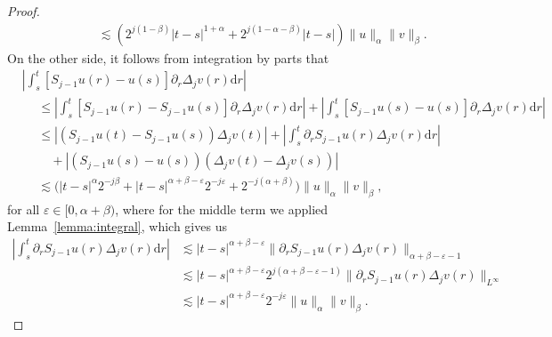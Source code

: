 \documentclass[a4paper,11pt]{article}
\newcommand{\mathd}{\mathrm{d}}
\theoremstyle{remark}
\begin{document}
\begin{proof}
\begin{align}
    &\hspace{50pt} \lesssim ( 2^{j ( 1- \beta)} | t-s |^{1+\alpha} +2^{j ( 1- \alpha - \beta )} | t-s | ) \| u \|_{\alpha} \| v \|_{\beta} .
  \end{align}
  On the other side, it follows from integration by parts that
  \begin{align}\label{eq:controlled old and new pr2} \nonumber
     &\left| \int_{s}^{t} [ S_{j-1} u ( r ) - u ( s ) ] \partial_{r}  \Delta_{j} v ( r ) \mathd r \right| \\ \nonumber
     &\hspace{15pt} \leqslant \left| \int_{s}^{t} [ S_{j-1} u ( r ) -S_{j-1} u ( s ) ] \partial_{r}  \Delta_{j} v ( r ) \mathd r \right|  + \left| \int_{s}^{t} [ S_{j-1} u ( s ) - u ( s ) ] \partial_{r}  \Delta_{j} v ( r ) \mathd r \right|\\ \nonumber
     &\hspace{15pt} \leqslant | (S_{j-1} u ( t ) - S_{j-1} u(s))  \Delta_{j} v ( t ) | + \left| \int_{s}^{t} \partial_{r} S_{j-1} u ( r )    \Delta_{j} v ( r ) \mathd r \right|\\ \nonumber
     &\hspace{15pt}\quad + |(S_{j-1} u ( s ) - u ( s ))(\Delta_j v(t) - \Delta_j v(s))| \\
     &\hspace{15pt}\lesssim \big( |t-s|^\alpha 2^{-j\beta} + |t-s|^{\alpha+\beta-\varepsilon} 2^{-j\varepsilon} + 2^{-j(\alpha+\beta)}\big)  \|u\|_\alpha \|v\|_\beta,
  \end{align}
  for all $\varepsilon \in [0,\alpha+\beta)$, where for the middle term we applied Lemma~\ref{lemma:integral}, which gives us
  \begin{align*}
      \left| \int_{s}^{t} \partial_{r} S_{j-1} u ( r ) \Delta_{j} v ( r ) \mathd r \right| & \lesssim |t-s|^{\alpha+\beta-\varepsilon} \|\partial_{r} S_{j-1} u ( r ) \Delta_{j} v ( r )\|_{\alpha+\beta-\varepsilon-1}\\
      & \lesssim |t-s|^{\alpha+\beta-\varepsilon} 2^{j(\alpha+\beta-\varepsilon-1)} \|\partial_{r} S_{j-1} u ( r ) \Delta_{j} v ( r )\|_{L^\infty} \\
      & \lesssim |t-s|^{\alpha+\beta-\varepsilon} 2^{-j\varepsilon} \|u\|_\alpha \|v\|_\beta.
  \end{align*}
%  
%  

\end{proof}
\end{document}
